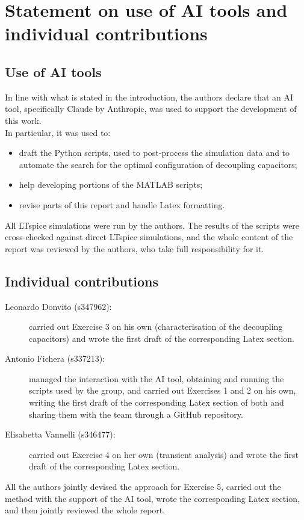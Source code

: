 \section*{Statement on use of AI tools and individual contributions}


\subsection*{Use of AI tools}
In line with what is stated in the introduction, the authors declare that
an AI tool, specifically Claude by Anthropic, was used to support the
development of this work.\\ In particular, it was used to:
\begin{itemize}
    \item draft the Python scripts, used to post-process the simulation data
    and to automate the search for the optimal configuration of decoupling capacitors;
    \item help developing portions of the MATLAB scripts;
    \item revise parts of this report and handle Latex formatting.
\end{itemize}
All LTspice simulations were run by the authors. The results of the
scripts were cross-checked against direct LTspice simulations, and the
whole content of the report was reviewed by the authors, who take full
responsibility for it.

\subsection*{Individual contributions}
\begin{description}
    \item[Leonardo Donvito (s347962):] carried out Exercise 3 on his own
    (characterisation of the decoupling capacitors) and wrote the
    first draft of the corresponding Latex section.
    \item[Antonio Fichera (s337213):] managed the interaction with the AI
    tool, obtaining and running the scripts used by the group, and
          carried out Exercises 1 and 2 on his own, writing the first draft
          of the corresponding Latex section of both and sharing them with
          the team through a GitHub repository.
    \item[Elisabetta Vannelli (s346477):] carried out Exercise 4 on her own
          (transient analysis) and wrote the first draft
          of the corresponding Latex section.
\end{description}
All the authors jointly devised the approach for Exercise 5, carried out
the method with the support of the AI tool, wrote the corresponding
Latex section, and then jointly reviewed the whole report.